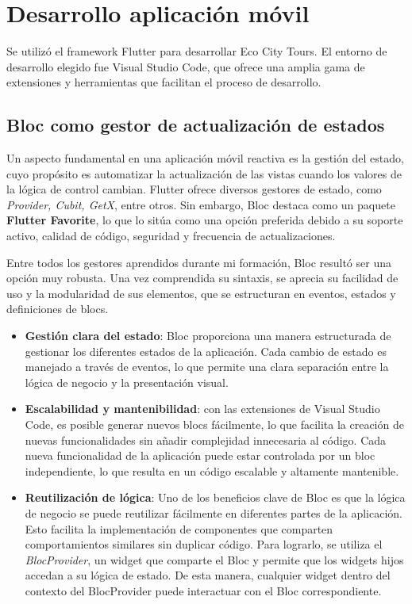 \section{Desarrollo aplicación móvil}
Se utilizó el framework Flutter\cite{flutter} para desarrollar Eco City Tours. El entorno de desarrollo elegido fue Visual Studio Code, que ofrece una amplia gama de extensiones y herramientas que facilitan el proceso de desarrollo.
	
	\subsection{Bloc como gestor de actualización de estados}
	Un aspecto fundamental en una aplicación móvil reactiva es la gestión del estado, cuyo propósito es automatizar la actualización de las vistas cuando los valores de la lógica de control cambian. Flutter ofrece diversos gestores de estado, como \textit{Provider, Cubit, GetX}, entre otros. Sin embargo, Bloc destaca como un paquete \textbf{Flutter Favorite}, lo que lo sitúa como una opción preferida debido a su soporte activo, calidad de código, seguridad y frecuencia de actualizaciones.
	
	Entre todos los gestores aprendidos durante mi formación, Bloc resultó ser una opción muy robusta. Una vez comprendida su sintaxis, se aprecia su facilidad de uso y la modularidad de sus elementos, que se estructuran en eventos, estados y definiciones de blocs.
	\begin{itemize}
		
		\item \textbf{Gestión clara del estado}: Bloc proporciona una manera estructurada de gestionar los diferentes estados de la aplicación. Cada cambio de estado es manejado a través de eventos, lo que permite una clara separación entre la lógica de negocio y la presentación visual.
		
		\item \textbf{Escalabilidad y mantenibilidad}: con las extensiones de Visual Studio Code, es posible generar nuevos blocs fácilmente, lo que facilita la creación de nuevas funcionalidades sin añadir complejidad innecesaria al código. Cada nueva funcionalidad de la aplicación puede estar controlada por un bloc independiente, lo que resulta en un código escalable y altamente mantenible.
				
		\item \textbf{Reutilización de lógica}: Uno de los beneficios clave de Bloc es que la lógica de negocio se puede reutilizar fácilmente en diferentes partes de la aplicación. Esto facilita la implementación de componentes que comparten comportamientos similares sin duplicar código. Para lograrlo, se utiliza el \textit{BlocProvider}, un widget que comparte el Bloc y permite que los widgets hijos accedan a su lógica de estado. De esta manera, cualquier widget dentro del contexto del BlocProvider puede interactuar con el Bloc correspondiente.
						
	\end{itemize}
	

